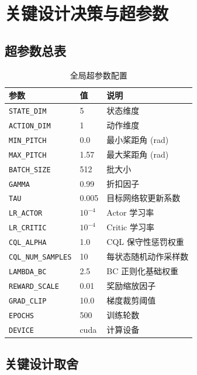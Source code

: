 \documentclass[11pt,a4paper]{ctexart}
\begin{document}
\section{关键设计决策与超参数}

\subsection{超参数总表}

\begin{table}[H]
\centering
\caption{全局超参数配置}
\begin{tabular}{lll}
\toprule
\textbf{参数} & \textbf{值} & \textbf{说明} \\
\midrule
\texttt{STATE\_DIM}      & 5      & 状态维度 \\
\texttt{ACTION\_DIM}     & 1      & 动作维度 \\
\texttt{MIN\_PITCH}      & 0.0    & 最小桨距角 (rad) \\
\texttt{MAX\_PITCH}      & 1.57   & 最大桨距角 (rad) \\
\texttt{BATCH\_SIZE}     & 512    & 批大小 \\
\texttt{GAMMA}           & 0.99   & 折扣因子 \\
\texttt{TAU}             & 0.005  & 目标网络软更新系数 \\
\texttt{LR\_ACTOR}       & $10^{-4}$ & Actor 学习率 \\
\texttt{LR\_CRITIC}      & $10^{-4}$ & Critic 学习率 \\
\texttt{CQL\_ALPHA}      & 1.0    & CQL 保守性惩罚权重 \\
\texttt{CQL\_NUM\_SAMPLES}& 10     & 每状态随机动作采样数 \\
\texttt{LAMBDA\_BC}      & 2.5    & BC 正则化基础权重 \\
\texttt{REWARD\_SCALE}   & 0.01   & 奖励缩放因子 \\
\texttt{GRAD\_CLIP}      & 10.0   & 梯度裁剪阈值 \\
\texttt{EPOCHS}          & 500    & 训练轮数 \\
\texttt{DEVICE}          & cuda   & 计算设备 \\
\bottomrule
\end{tabular}
\end{table}

\subsection{关键设计取舍}
\end{document}
